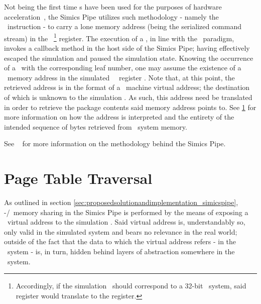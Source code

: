 Not being the first time \dvttermmagicinstruction s have been used for the purposes of hardware acceleration~, the Simics Pipe utilizes such methodology - namely the  \dvttermxeightysix\ instruction - to carry a lone memory address (being the serialized command stream) in the \dvttermtarget\ \footnote{Accordingly, if the simulation \dvttermtarget\ should correspond to a 32-bit \dvttermxeightysix\ system, said register would translate to the  register.} register.
The execution of a \dvttermmagicinstruction , in line with the \dvttermmagicinstruction\ paradigm, invokes a callback method in the host side of the Simics Pipe; having effectively escaped the simulation and paused the simulation state.
Knowing the occurrence of a \dvttermmagicinstruction\ with the corresponding leaf number, one may assume the existence of a \dvttermtarget\ memory address in the simulated \dvttermtarget\ \dvttermcpu\ register .
Note that, at this point, the retrieved address is in the format of a \dvttermtarget\ machine virtual address; the destination of which is unknown to the simulation \dvttermhost .
As such, this address need be translated in order to retrieve the package contents said memory address points to.
See \ref{sec:proposedsolutionandimplementation_pagetabletraversal} for more information on how the address is interpreted and the entirety of the intended sequence of bytes retrieved from \dvttermhost\ system memory.

See ~ for more information on the methodology behind the Simics Pipe.

\section{Page Table Traversal}
\label{sec:proposedsolutionandimplementation_pagetabletraversal}
As outlined in section \ref{sec:proposedsolutionandimplementation_simicspipe}, \dvttermtarget -/\dvttermhost\ memory sharing in the Simics Pipe is performed by the means of exposing a \dvttermtarget\ virtual address to the simulation \dvttermhost .
Said virtual address is, understandably so, only valid in the simulated system and bears no relevance in the real world; outside of the fact that the data to which the virtual address refers - in the \dvttermtarget\ system - is, in turn, hidden behind layers of abstraction somewhere in the \dvttermhost\ system.

